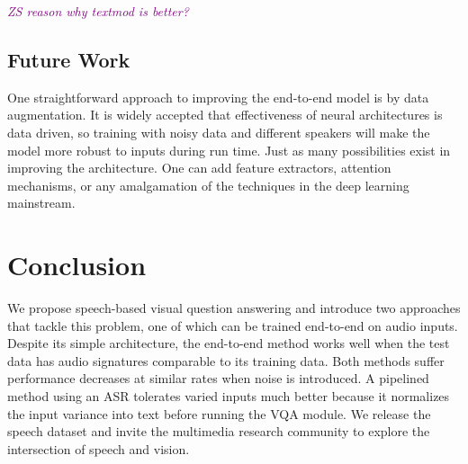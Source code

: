 \documentclass[letterpaper]{article} %
\newcommand{\tz}[1]{\textcolor{purple}{\textit{#1}}}
\begin{document}
\tz{ZS reason why textmod is better?}

\subsection{Future Work}

One straightforward approach to improving the end-to-end model is by data augmentation. It is widely accepted that effectiveness of neural architectures is data driven, so training with noisy data and different speakers will make the model more robust to inputs during run time. Just as many possibilities exist in improving the architecture. One can add feature extractors, attention mechanisms, or any amalgamation of the techniques in the deep learning mainstream.

\section{Conclusion}

We propose speech-based visual question answering and introduce two approaches that tackle this problem, one of which can be trained end-to-end on audio inputs. Despite its simple architecture, the end-to-end method works well when the test data has audio signatures comparable to its training data. Both methods suffer performance decreases at similar rates when noise is introduced. A pipelined method using an ASR tolerates varied inputs much better because it normalizes the input variance into text before running the VQA module. We release the speech dataset and invite the multimedia research community to explore the intersection of speech and vision.


 
\end{document}
